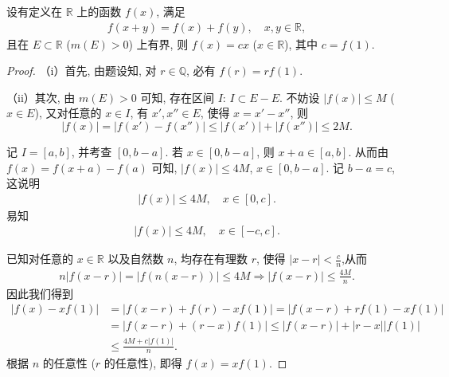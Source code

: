 \documentclass[../../main.tex]{subfiles}%
\begin{document}
\begin{proposition}\label{proposition:存在某个正测集的Cauchy方程函数必是线性函数}
设有定义在 $\mathbb{R}$ 上的函数 $f(x)$, 满足
\begin{align*}
f(x + y) = f(x) + f(y),\quad x,y\in\mathbb{R},
\end{align*}
且在 $E\subset\mathbb{R}$ ($m(E)>0$) 上有界, 则 $f(x)=cx$ ($x\in\mathbb{R}$), 其中 $c = f(1)$.
\end{proposition}
\begin{proof}

（i）首先, 由题设知, 对 $r\in\mathbb{Q}$, 必有 $f(r)=rf(1)$.

（ii）其次, 由 $m(E)>0$ 可知, 存在区间 $I$: $I\subset E - E$. 不妨设 $|f(x)|\leqslant M$ ($x\in E$), 又对任意的 $x\in I$, 有 $x',x''\in E$, 使得 $x = x' - x''$, 则
\[
|f(x)| = |f(x') - f(x'')|\leqslant |f(x')| + |f(x'')|\leqslant 2M.
\]

记 $I = [a,b]$, 并考查 $[0,b - a]$. 若 $x\in [0,b - a]$, 则 $x + a\in [a,b]$. 从而由 $f(x) = f(x + a) - f(a)$ 可知, $|f(x)|\leqslant 4M$, $x\in [0,b - a]$. 记 $b - a = c$, 这说明
\begin{align*}
|f(x)|\leqslant 4M,\quad x\in [0,c].
\end{align*}
易知
\begin{align*}
|f(x)|\leqslant 4M,\quad x\in [-c,c].
\end{align*}

已知对任意的 $x\in\mathbb{R}$ 以及自然数 $n$, 均存在有理数 $r$, 使得 $|x - r|<\frac{c}{n}$,从而
\begin{align*}
n\left| f\left( x-r \right) \right|=\left| f\left( n\left( x-r \right) \right) \right|\leqslant 4M\Longrightarrow \left| f\left( x-r \right) \right|\leqslant \frac{4M}{n}.
\end{align*}
因此我们得到
\begin{align*}
|f(x)-xf(1)|&=\left| f\left( x-r \right) +f\left( r \right) -xf\left( 1 \right) \right|=\left| f\left( x-r \right) +rf\left( 1 \right) -xf\left( 1 \right) \right|
\\
&=\left| f\left( x-r \right) +\left( r-x \right) f\left( 1 \right) \right|\leqslant \left| f\left( x-r \right) \right|+\left| r-x \right|\left| f\left( 1 \right) \right|
\\
&\leqslant \frac{4M+c|f(1)|}{n}.
\end{align*}
根据 $n$ 的任意性 ($r$ 的任意性), 即得 $f(x)=xf(1)$. 

\end{proof}
\end{document}
